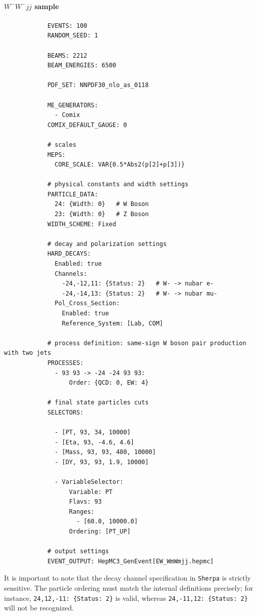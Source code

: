 \documentclass[12pt]{article}
\begin{document}
        \paragraph{$W^{-}W^{-} jj$ sample}
        \begin{lstlisting}
            EVENTS: 100
            RANDOM_SEED: 1

            BEAMS: 2212
            BEAM_ENERGIES: 6500

            PDF_SET: NNPDF30_nlo_as_0118

            ME_GENERATORS:
              - Comix
            COMIX_DEFAULT_GAUGE: 0

            # scales
            MEPS:
              CORE_SCALE: VAR{0.5*Abs2(p[2]+p[3])}

            # physical constants and width settings
            PARTICLE_DATA:
              24: {Width: 0}   # W Boson
              23: {Width: 0}   # Z Boson
            WIDTH_SCHEME: Fixed

            # decay and polarization settings
            HARD_DECAYS:
              Enabled: true
              Channels:
                -24,-12,11: {Status: 2}   # W- -> nubar e-
                -24,-14,13: {Status: 2}   # W- -> nubar mu-
              Pol_Cross_Section:
                Enabled: true
                Reference_System: [Lab, COM]

            # process definition: same-sign W boson pair production with two jets
            PROCESSES:
              - 93 93 -> -24 -24 93 93:
                  Order: {QCD: 0, EW: 4}

            # final state particles cuts
            SELECTORS:

              - [PT, 93, 34, 10000]
              - [Eta, 93, -4.6, 4.6]
              - [Mass, 93, 93, 480, 10000]
              - [DY, 93, 93, 1.9, 10000]

              - VariableSelector:
                  Variable: PT
                  Flavs: 93
                  Ranges:
                    - [60.0, 10000.0]
                  Ordering: [PT_UP]

            # output settings
            EVENT_OUTPUT: HepMC3_GenEvent[EW_WmWmjj.hepmc]
        \end{lstlisting}

        It is important to note that the decay channel specification in \verb|Sherpa| is strictly sensitive. The particle ordering must match the internal definitions precisely; for instance, \verb|24,12,-11: {Status: 2}| is valid, whereas \verb|24,-11,12: {Status: 2}| will not be recognized.
\end{document}
